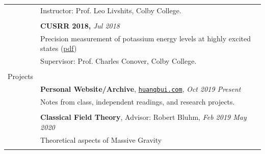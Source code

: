 \documentclass[10pt]{article}
\begin{document}
\begin{longtable}{ l p{14.7cm}   }
	& Instructor: Prof. Leo Livshits, Colby College.\\
	&\\
	& \textbf{CUSRR 2018,} \textit{Jul 2018}\\
	& Precision measurement of potassium energy levels at highly excited states (\href{https://huanqbui.com/research/CUSRR2018.pdf}{{pdf}})\\
	& Supervisor: Prof. Charles Conover, Colby College.\\
	& \\ 
	
	
	\large{Projects}		& \\ 
	& \textbf{Personal Website/Archive}, %
	\href{https://huanqbui.com}{\texttt{huanqbui.com}}, \textit{Oct 2019 \textendash Present} \\
	& Notes from class, independent readings, and research projects.\\
	& \\
		
	
	& \textbf{Classical Field Theory}, Advisor: Robert Bluhm, \textit{Feb 2019 \textendash May 2020}\\
	& Theoretical aspects of Massive Gravity\\
	& \\

     					
     					




\end{longtable}
\end{document}
